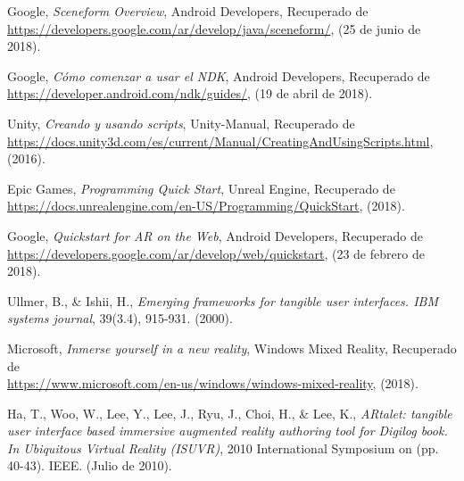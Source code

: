 Google, {\em Sceneform Overview}, Android Developers, Recuperado de \\
\url{https://developers.google.com/ar/develop/java/sceneform/}, (25 de junio de 2018).

Google, {\em Cómo comenzar a usar el NDK}, Android Developers, Recuperado de \\
\url{https://developer.android.com/ndk/guides/}, (19 de abril de 2018).

Unity, {\em Creando y usando scripts}, Unity-Manual, Recuperado de \\
\url{https://docs.unity3d.com/es/current/Manual/CreatingAndUsingScripts.html}, (2016).

Epic Games, {\em Programming Quick Start}, Unreal Engine, Recuperado de \\
\url{https://docs.unrealengine.com/en-US/Programming/QuickStart}, (2018).

Google, {\em Quickstart for AR on the Web}, Android Developers, Recuperado de \\
\url{https://developers.google.com/ar/develop/web/quickstart}, (23 de febrero de 2018).

Ullmer, B., & Ishii, H., {\em Emerging frameworks for tangible user interfaces. IBM systems journal}, 39(3.4), 915-931. (2000).

Microsoft, {\em Inmerse yourself in a new reality}, Windows Mixed Reality, Recuperado de \\
\url{https://www.microsoft.com/en-us/windows/windows-mixed-reality}, (2018).

Ha, T., Woo, W., Lee, Y., Lee, J., Ryu, J., Choi, H., & Lee, K., {\em ARtalet: tangible user interface based immersive augmented reality authoring tool for Digilog book. In Ubiquitous Virtual Reality (ISUVR)}, 2010 International Symposium on (pp. 40-43). IEEE. (Julio de 2010).
